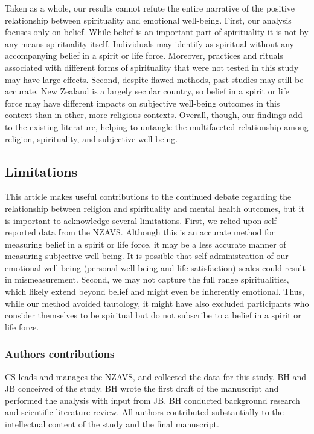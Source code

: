 \documentclass[
  english,
  man]{apa6}
\begin{document}
Taken as a whole, our results cannot refute the entire narrative of the positive relationship between spirituality and emotional well-being. First, our analysis focuses only on belief. While belief is an important part of spirituality it is not by any means spirituality itself. Individuals may identify as spiritual without any accompanying belief in a spirit or life force. Moreover, practices and rituals associated with different forms of spirituality that were not tested in this study may have large effects. Second, despite flawed methods, past studies may still be accurate. New Zealand is a largely secular country, so belief in a spirit or life force may have different impacts on subjective well-being outcomes in this context than in other, more religious contexts. Overall, though, our findings add to the existing literature, helping to untangle the multifaceted relationship among religion, spirituality, and subjective well-being.

\hypertarget{limitations}{%
\subsection{Limitations}\label{limitations}}

This article makes useful contributions to the continued debate regarding the relationship between religion and spirituality and mental health outcomes, but it is important to acknowledge several limitations. First, we relied upon self-reported data from the NZAVS. Although this is an accurate method for measuring belief in a spirit or life force, it may be a less accurate manner of measuring subjective well-being. It is possible that self-administration of our emotional well-being (personal well-being and life satisfaction) scales could result in mismeasurement. Second, we may not capture the full range spiritualities, which likely extend beyond belief and might even be inherently emotional. Thus, while our method avoided tautology, it might have also excluded participants who consider themselves to be spiritual but do not subscribe to a belief in a spirit or life force.

\hypertarget{authors-contributions}{%
\subsubsection{Authors contributions}\label{authors-contributions}}

CS leads and manages the NZAVS, and collected the data for this study. BH and JB conceived
of the study. BH wrote the first draft of the manuscript and performed the analysis with input from JB. BH conducted background research and scientific literature review. All authors contributed substantially to the intellectual content of the study and the final manuscript.
\end{document}
